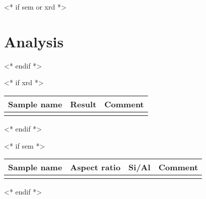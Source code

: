 \documentclass[10pt,a4paper]{article}
\begin{document}
<* if sem or xrd *>
\section{Analysis}
<* endif *>

<* if xrd *>
\begin{center}
    \begin{tabularx}{\textwidth}{C|C|C}
    \toprule
    Sample name & Result & Comment \\
    \midrule
            &        &         \\
    \bottomrule
    \end{tabularx}
\end{center}
<* endif *>

<* if sem *>
\begin{center}
    \begin{tabularx}{\textwidth}{C|C|C|C}
    \toprule
    Sample name & Aspect ratio & Si/Al & Comment \\
    \midrule
            &              &       &   \\
    \bottomrule
    \end{tabularx}
\end{center}
<* endif *>
\end{document}
